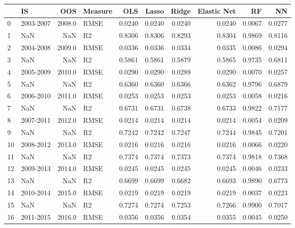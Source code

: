 \begin{tabular}{llrlrrrrrr}
\toprule
{} &         IS &     OOS & Measure &     OLS &   Lasso &   Ridge &  Elastic Net &      RF &      NN \\
\midrule
0  &  2003-2007 &  2008.0 &    RMSE &  0.0240 &  0.0240 &  0.0240 &       0.0240 &  0.0067 &  0.0277 \\
1  &        NaN &     NaN &      R2 &  0.8306 &  0.8306 &  0.8293 &       0.8304 &  0.9869 &  0.8116 \\
2  &  2004-2008 &  2009.0 &    RMSE &  0.0336 &  0.0336 &  0.0334 &       0.0335 &  0.0086 &  0.0294 \\
3  &        NaN &     NaN &      R2 &  0.5861 &  0.5861 &  0.5879 &       0.5865 &  0.9735 &  0.6811 \\
4  &  2005-2009 &  2010.0 &    RMSE &  0.0290 &  0.0290 &  0.0289 &       0.0290 &  0.0070 &  0.0257 \\
5  &        NaN &     NaN &      R2 &  0.6360 &  0.6360 &  0.6366 &       0.6362 &  0.9796 &  0.6879 \\
6  &  2006-2010 &  2011.0 &    RMSE &  0.0253 &  0.0253 &  0.0253 &       0.0253 &  0.0058 &  0.0216 \\
7  &        NaN &     NaN &      R2 &  0.6731 &  0.6731 &  0.6738 &       0.6733 &  0.9822 &  0.7177 \\
8  &  2007-2011 &  2012.0 &    RMSE &  0.0214 &  0.0214 &  0.0214 &       0.0214 &  0.0054 &  0.0209 \\
9  &        NaN &     NaN &      R2 &  0.7242 &  0.7242 &  0.7247 &       0.7244 &  0.9845 &  0.7201 \\
10 &  2008-2012 &  2013.0 &    RMSE &  0.0216 &  0.0216 &  0.0216 &       0.0216 &  0.0066 &  0.0220 \\
11 &        NaN &     NaN &      R2 &  0.7374 &  0.7374 &  0.7373 &       0.7374 &  0.9818 &  0.7368 \\
12 &  2009-2013 &  2014.0 &    RMSE &  0.0245 &  0.0245 &  0.0245 &       0.0245 &  0.0046 &  0.0233 \\
13 &        NaN &     NaN &      R2 &  0.6699 &  0.6699 &  0.6682 &       0.6693 &  0.9890 &  0.6773 \\
14 &  2010-2014 &  2015.0 &    RMSE &  0.0219 &  0.0219 &  0.0219 &       0.0219 &  0.0037 &  0.0223 \\
15 &        NaN &     NaN &      R2 &  0.7274 &  0.7274 &  0.7253 &       0.7266 &  0.9900 &  0.7017 \\
16 &  2011-2015 &  2016.0 &    RMSE &  0.0356 &  0.0356 &  0.0354 &       0.0355 &  0.0045 &  0.0250 \\

\end{tabular}
